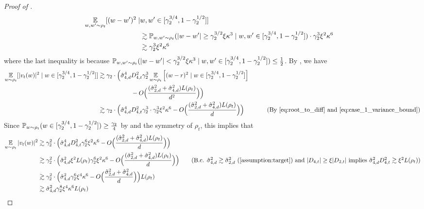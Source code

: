 \begin{proof}[Proof of ]
\begin{align}
\operatorname*{\mathbb{E}}_{w, w' \sim \rho_t} [(w - w')^2 \mid & w, w' \in [\gamma_2^{3/4}, 1 - \gamma_2^{1/2}]] \\
& \gtrsim \mathbb{P}_{w, w' \sim \rho_t}(|w - w'| \geq \gamma_2^{3/2} \xi \kappa^3 \mid w, w' \in [\gamma_2^{3/4}, 1 - \gamma_2^{1/2}]) \cdot \gamma_2^3 \xi^2 \kappa^6 \\
& \gtrsim \gamma_2^3 \xi^2 \kappa^6
& \label{eq:case_1_variance_bound}
\end{align}
where the last inequality is because $\mathbb{P}_{w, w' \sim \rho_t}(|w - w'| < \gamma_2^{3/2} \xi\kappa^3 \mid w, w' \in [\gamma_2^{3/4}, 1 - \gamma_2^{1/2}]) \leq \frac{1}{2}$. By , we have
\begin{align}
\E_{\w \sim \rho_t} [|\vel_t(\w)|^2 \mid \w \in [\gamma_2^{3/4}, 1 - \gamma_2^{1/2}]]
& \gtrsim \gamma_2 \cdot \Big(\sigmaCoeffFour^4 D_{4, t}^2 \gamma_2^3 \E_{\w \sim \rho_t} \Big[(\w - r)^2 \mid \w \in [\gamma_2^{3/4}, 1 - \gamma_2^{1/2}]\Big] \\
& \nextlinespace\nextlinespace - O\Big(\frac{(\sigmaCoeffTwo^2 + \sigmaCoeffFour^2) L(\rho_t)}{d^2}\Big)\Big) \\
& \gtrsim \gamma_2 \cdot \Big(\sigmaCoeffFour^4 D_{4, t}^2 \gamma_2^3 \cdot \gamma_2^3 \xi^2 \kappa^6 - O\Big(\frac{(\sigmaCoeffTwo^2 + \sigmaCoeffFour^2) L(\rho_t)}{d}\Big)\Big)
& \tag{By \Cref{eq:root_to_diff} and \Cref{eq:case_1_variance_bound}}
\end{align}
Since $\mathbb{P}_{w \sim \rho_t}(w \in [\gamma_2^{3/4}, 1 - \gamma_2^{1/2}]) \geq \frac{\gamma_2}{4}$ by  and the symmetry of $\rho_t$, this implies that
\begin{align}
\E_{\w \sim \rho_t} |\vel_t(\w)|^2
& \gtrsim \gamma_2^2 \cdot \Big(\sigmaCoeffFour^4 D_{4, t}^2 \gamma_2^6 \xi^2 \kappa^6 - O\Big(\frac{(\sigmaCoeffTwo^2 + \sigmaCoeffFour^2) L(\rho_t)}{d}\Big)\Big) \\
& \gtrsim \gamma_2^2 \cdot \Big( \sigmaCoeffFour^2 \xi^2 L(\rho_t) \gamma_2^6 \xi^2 \kappa^6 - O\Big(\frac{(\sigmaCoeffTwo^2 + \sigmaCoeffFour^2) L(\rho_t)}{d}\Big)\Big)
\tag{B.c. $\sigmaCoeffFour^2 \gtrsim \sigmaCoeffTwo^2$ (\Cref{assumption:target}) and $|D_{4, t}| \geq \xi |D_{2, t}|$ implies $\sigmaCoeffFour^2 D_{4, t}^2 \gtrsim \xi^2 L(\rho_t)$} \\
& \gtrsim \gamma_2^2 \cdot \Big(\sigmaCoeffFour^2 \gamma_2^6 \xi^4 \kappa^6 - O\Big(\frac{\sigmaCoeffTwo^2 + \sigmaCoeffFour^2}{d}\Big)\Big) L(\rho_t) \\
& \gtrsim \sigmaCoeffFour^2 \gamma_2^8 \xi^4 \kappa^6 L(\rho_t)

\end{align}
\end{proof}

